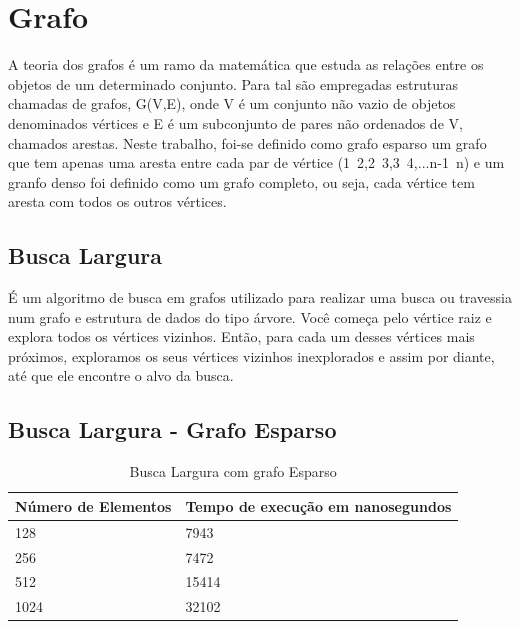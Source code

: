 \documentclass[12pt,a4paper,twoside]{report}
\begin{document}
\chapter{Grafo}

A teoria dos grafos é um ramo da matemática que estuda as relações entre os objetos de um determinado conjunto. Para tal são empregadas estruturas chamadas de grafos, G(V,E), onde V é um conjunto não vazio de objetos denominados vértices e E é um subconjunto de pares não ordenados de V, chamados arestas. Neste trabalho, foi-se definido como grafo esparso um grafo que tem apenas uma aresta entre cada par de vértice (1~2,2~3,3~4,...n-1~n) e um granfo denso foi definido como um grafo completo, ou seja, cada vértice tem aresta com todos os outros vértices.

\section{Busca Largura}

É um algoritmo de busca em grafos utilizado para realizar uma busca ou travessia num grafo e estrutura de dados do tipo árvore. Você começa pelo vértice raiz e explora todos os vértices vizinhos. Então, para cada um desses vértices mais próximos, exploramos os seus vértices vizinhos inexplorados e assim por diante, até que ele encontre o alvo da busca.

\section{Busca Largura - Grafo Esparso}
\begin{table}[H]
\centering
\caption{Busca Largura com grafo Esparso}
\begin{tabular}{|l|l|}
\hline
\multicolumn{1}{|c|}{\textbf{Número de Elementos}} & \multicolumn{1}{c|}{\textbf{Tempo de execução em nanosegundos}} \\ \hline
128 & 7943 \\ \hline
256 & 7472 \\ \hline
512 & 15414 \\ \hline
1024 & 32102 \\ \hline
\end{tabular}
\end{table}
\end{document}
